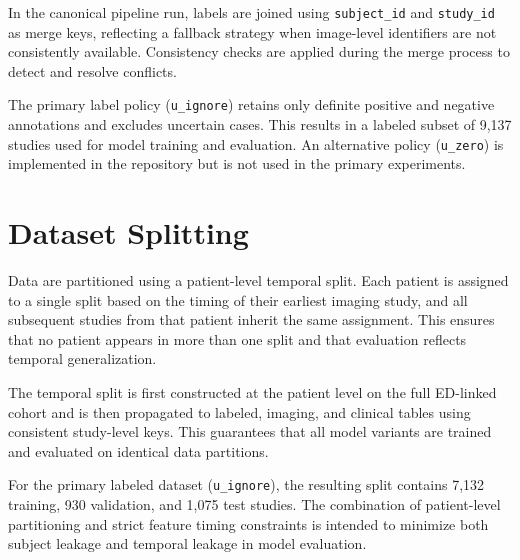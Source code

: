 In the canonical pipeline run, labels are joined using \texttt{subject\_id} and \texttt{study\_id} as merge keys, reflecting a fallback strategy when image-level identifiers are not consistently available. Consistency checks are applied during the merge process to detect and resolve conflicts.

The primary label policy (\texttt{u\_ignore}) retains only definite positive and negative annotations and excludes uncertain cases. This results in a labeled subset of 9{,}137 studies used for model training and evaluation. An alternative policy (\texttt{u\_zero}) is implemented in the repository but is not used in the primary experiments.

\section{Dataset Splitting}

Data are partitioned using a patient-level temporal split. Each patient is assigned to a single split based on the timing of their earliest imaging study, and all subsequent studies from that patient inherit the same assignment. This ensures that no patient appears in more than one split and that evaluation reflects temporal generalization.

The temporal split is first constructed at the patient level on the full ED-linked cohort and is then propagated to labeled, imaging, and clinical tables using consistent study-level keys. This guarantees that all model variants are trained and evaluated on identical data partitions.

For the primary labeled dataset (\texttt{u\_ignore}), the resulting split contains 7{,}132 training, 930 validation, and 1{,}075 test studies. The combination of patient-level partitioning and strict feature timing constraints is intended to minimize both subject leakage and temporal leakage in model evaluation.